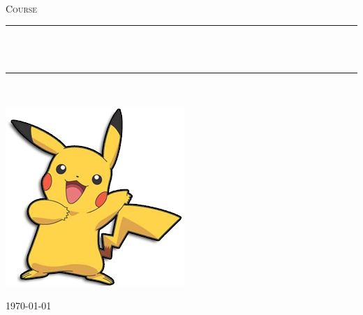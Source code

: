 \begin{titlepage}

\begin{center}


 
~\\[1.5cm]

\textsc{\Large Course}\\[0.5cm]

\hrule ~\\[0.2cm]
{\huge \bfseries \mytitle}\\[0.4cm]		%
\hrule ~\\[1.5cm]


\vspace*{1.5 cm}

\begin{minipage}{0.4\textwidth}
    \centering
	\large
		\includegraphics[scale=0.5]{img/pica.png}
		\myauthor
\end{minipage}

\vfill

{\large \today}

\end{center}
\end{titlepage}